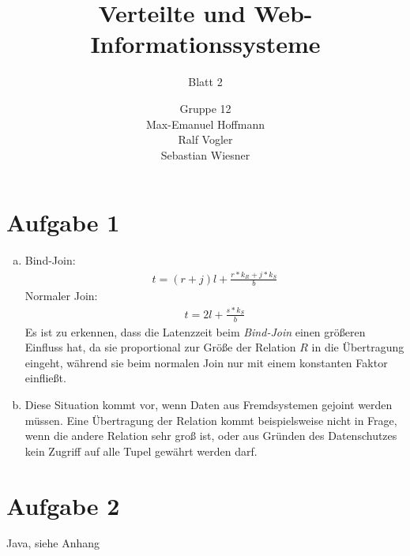\documentclass[11pt,a4paper]{scrartcl}
\begin{document}
\author{Gruppe 12\\Max-Emanuel Hoffmann\\Ralf Vogler\\Sebastian Wiesner}
\title{Verteilte und Web-Informationssysteme}
\subtitle{Blatt 2}

\maketitle

\section*{Aufgabe 1}

\begin{enumerate}[a)]
\item Bind-Join:
\begin{align*}
t = (r + j)l + \frac{r*k_R + j*k_S}{b}
\end{align*}
Normaler Join:
\begin{align*}
t = 2l + \frac{s*k_S}{b}
\end{align*}
Es ist zu erkennen, dass die Latenzzeit beim \emph{Bind-Join} einen größeren
Einfluss hat, da sie proportional zur Größe der Relation $R$ in die 
Übertragung eingeht, während sie beim normalen Join nur mit einem konstanten 
Faktor einfließt.
\item Diese Situation kommt vor, wenn Daten aus Fremdsystemen gejoint werden
müssen.  Eine Übertragung der Relation kommt beispielsweise nicht in Frage, 
wenn die andere Relation sehr groß ist, oder aus Gründen des Datenschutzes 
kein Zugriff auf alle Tupel gewährt werden darf.
\end{enumerate}

\section*{Aufgabe 2}
Java, siehe Anhang
\end{document}
